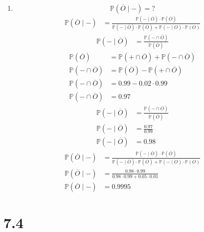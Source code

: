 \documentclass{article}
\begin{document}
\begin{enumerate}[label = \textbf{\alph*)}]
	\item \[ \mathbb{P}(\overline{O} \mid -) = \mathord{?} \]
	      \begin{align*}
		      \mathbb{P}(\overline{O} \mid -) & = \frac{ \mathbb{P}(- \mid \overline{O}) \cdot \mathbb{P}(\overline{O}) }{ \mathbb{P}(- \mid \overline{O}) \cdot \mathbb{P}(\overline{O}) + \mathbb{P}(- \mid O) \cdot \mathbb{P}(O) }
	      \end{align*}
	      \begin{align*}
		      \mathbb{P}(- \mid \overline{O}) & = \frac{ \mathbb{P}(- \cap \overline{O}) }{ \mathbb{P}(\overline{O}) }
	      \end{align*}
	      \begin{align*}
		      \mathbb{P}(\overline{O})        & = \mathbb{P}(+ \cap \overline{O}) + \mathbb{P}(- \cap \overline{O}) \\
		      \mathbb{P}(- \cap \overline{O}) & = \mathbb{P}(\overline{O}) - \mathbb{P}(+ \cap \overline{O})        \\
		      \mathbb{P}(- \cap \overline{O}) & = 0.99 - 0.02 \cdot 0.99                                            \\
		      \mathbb{P}(- \cap \overline{O}) & = 0.97
	      \end{align*}
	      \begin{align*}
		      \mathbb{P}(- \mid \overline{O}) & = \frac{ \mathbb{P}(- \cap \overline{O}) }{ \mathbb{P}(\overline{O}) } \\
		      \mathbb{P}(- \mid \overline{O}) & = \frac{ 0.97 }{ 0.99 }                                                \\
		      \mathbb{P}(- \mid \overline{O}) & = 0.98
	      \end{align*}
	      \begin{align*}
		      \mathbb{P}(\overline{O} \mid -) & = \frac{ \mathbb{P}(- \mid \overline{O}) \cdot \mathbb{P}(\overline{O}) }{ \mathbb{P}(- \mid \overline{O}) \cdot \mathbb{P}(\overline{O}) + \mathbb{P}(- \mid O) \cdot \mathbb{P}(O) } \\
		      \mathbb{P}(\overline{O} \mid -) & = \frac{ 0.98 \cdot 0.99 }{ 0.98 \cdot 0.99 + 0.05 \cdot 0.01 }                                                                                                                        \\
		      \mathbb{P}(\overline{O} \mid -) & = 0.9995
	      \end{align*}
\end{enumerate}

\section{7.4}
\end{document}

